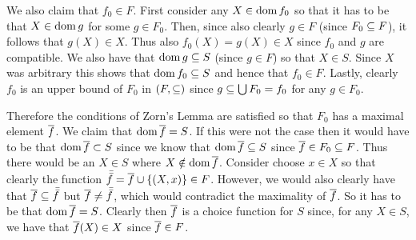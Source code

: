 \begin{questions}
{{    We also claim that $f_0 \in F$.
    First consider any $X \in \dom{f_0}$ so that it has to be that $X \in \dom{g}$ for some $g \in F_0$.
    Then, since also clearly $g \in F$ (since $F_0 \ss F$), it follows that $g(X) \in X$.
    Thus also $f_0(X) = g(X) \in X$ since $f_0$ and $g$ are compatible.
    We also have that $\dom{g} \ss S$ (since $g \in F$) so that $X \in S$.
    Since $X$ was arbitrary this shows that $\dom{f_0} \ss S$ and hence that $f_0 \in F$.
    Lastly, clearly $f_0$ is an upper bound of $F_0$ in $(F, \ss)$ since $g \ss \bigcup F_0 = f_0$ for any $g \in F_0$.

    Therefore the conditions of Zorn's Lemma are satisfied so that $F_0$ has a maximal element $\fb$.
    We claim that $\dom{\fb} = S$.
    If this were not the case then it would have to be that $\dom{\fb} \pss S$ since we know that $\dom{\fb} \ss S$ since $\fb \in F_0 \ss F$.
    Thus there would be an $X \in S$ where $X \notin \dom{\fb}$.
    Consider choose $x \in X$ so that clearly the function $\fbb = \fb \cup \braces{(X, x)} \in F$.
    However, we would also clearly have that $\fb \ss \fbb$ but $\fb \neq \fbb$, which would contradict the maximality of $\fb$.
    So it has to be that $\dom{\fb} = S$.
    Clearly then $\fb$ is a choice function for $S$ since, for any $X \in S$, we have that $\fb(X) \in X$ since $\fb \in F$.
  }
}

\end{questions}

